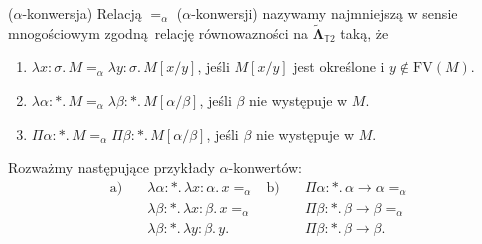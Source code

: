   \begin{definicja}(\(\alpha\)-konwersja) 
    Relacją \(=_{\alpha}\) (\(\alpha\)-konwersji) nazywamy najmniejszą w sensie mnogościowym zgodną relację równowazności na \(\mathbf{\tilde\Lambda}_{\mathbb{T}2}\) taką, że
    \begin{enumerate}[label=(\(\alpha\)\arabic*), ref=(\(\alpha\)\arabic*)]
      \setlength\itemsep{0em}
      \item \(\lambda x:\sigma.\,M =_\alpha \lambda y:\sigma.\,M[x/y]\), jeśli \(M[x/y]\) jest określone i \(y\not\in \mathrm{FV}(M)\).
      \item \(\lambda \alpha:*.\,M =_\alpha \lambda \beta:*.\,M[\alpha/\beta]\), jeśli \(\beta\) nie występuje w \(M\).
      \item \(\Pi \alpha:*.\,M =_\alpha \Pi \beta:*.\,M[\alpha/\beta]\), jeśli \(\beta\) nie występuje w \(M\).
    \end{enumerate}
  \end{definicja}

\begin{przyklad} Rozważmy następujące przykłady \(\alpha\)-konwertów:
  \begin{align*}
    \text{a)}\quad &\lambda \alpha:*.\,\lambda x:\alpha.\,x=_\alpha 
              & \text{b)} \quad& \Pi \alpha:*.\,\alpha\to\alpha =_\alpha\\
    &\lambda \beta:*.\,\lambda x:\beta.\, x=_\alpha 
              & &\Pi\beta:*.\,\beta\to\beta  =_\alpha\\ 
    &\lambda \beta:*.\,\lambda y:\beta.\, y. 
              & &\Pi\beta:*.\,\beta\to\beta.
  \end{align*}
\end{przyklad}

